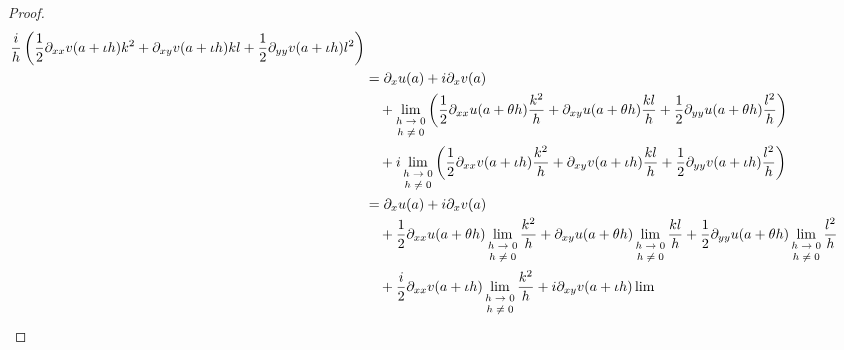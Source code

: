 \documentclass[dvipdfmx]{jsarticle}
\begin{document}
\begin{proof}
\begin{align*}
{\begin{matrix}
\end{matrix}}{\frac{i}{h}\left( \frac{1}{2}\partial_{xx}v(a + \iota h)k^{2} + \partial_{xy}v(a + \iota h)kl + \frac{1}{2}\partial_{yy}v(a + \iota h)l^{2} \right)}\\
&= \partial_{x}u(a) + i\partial_{x}v(a) \\
&\quad + \lim_{\scriptsize \begin{matrix}
h \rightarrow 0 \\
h \neq 0 \\
\end{matrix}}\left( \frac{1}{2}\partial_{xx}u(a + \theta h)\frac{k^{2}}{h} + \partial_{xy}u(a + \theta h)\frac{kl}{h} + \frac{1}{2}\partial_{yy}u(a + \theta h)\frac{l^{2}}{h} \right) \\
&\quad + i\lim_{\scriptsize \begin{matrix}
h \rightarrow 0 \\
h \neq 0 \\
\end{matrix}}\left( \frac{1}{2}\partial_{xx}v(a + \iota h)\frac{k^{2}}{h} + \partial_{xy}v(a + \iota h)\frac{kl}{h} + \frac{1}{2}\partial_{yy}v(a + \iota h)\frac{l^{2}}{h} \right)\\
&= \partial_{x}u(a) + i\partial_{x}v(a) \\
&\quad + \frac{1}{2}\partial_{xx}u(a + \theta h)\lim_{\scriptsize \begin{matrix}
h \rightarrow 0 \\
h \neq 0 \\
\end{matrix}}\frac{k^{2}}{h} + \partial_{xy}u(a + \theta h)\lim_{\scriptsize \begin{matrix}
h \rightarrow 0 \\
h \neq 0 \\
\end{matrix}}\frac{kl}{h} + \frac{1}{2}\partial_{yy}u(a + \theta h)\lim_{\scriptsize \begin{matrix}
h \rightarrow 0 \\
h \neq 0 \\
\end{matrix}}\frac{l^{2}}{h} \\
&\quad + \frac{i}{2}\partial_{xx}v(a + \iota h)\lim_{\scriptsize \begin{matrix}
h \rightarrow 0 \\
h \neq 0 \\
\end{matrix}}\frac{k^{2}}{h} + i\partial_{xy}v(a + \iota h)\lim_{\scriptsize \begin{matrix}

\end{matrix}}
\end{align*}
\end{proof}
\end{document}
